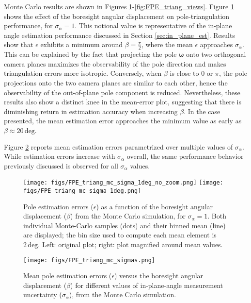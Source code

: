 Monte Carlo results are shown in Figures \ref{fig:FPE_triang_mc_sigma_1deg}-\ref{fig:FPE_triang_views}. Figure \ref{fig:FPE_triang_mc_sigma_1deg} shows the effect of the boresight angular displacement on pole-triangulation performance, for $\sigma_\alpha=1$. This notional value is representative of the in-plane angle estimation performance discussed in Section \ref{sec:in_plane_est}. Results show that $\epsilon$ exhibits a minimum around $\beta=\frac{\pi}{2}$, where the mean $\epsilon$ approaches $\sigma_\alpha$. This can be explained by the fact that projecting the pole $\boldsymbol{\omega}$ onto two orthogonal camera planes maximizes the observability of the pole direction and makes triangulation errors more isotropic. Conversely, when $\beta$ is close to $0$ or $\pi$, the pole projections onto the two camera planes are similar to each other, hence the observability of the out-of-plane pole component is reduced. Nevertheless, these results also show a distinct knee in the mean-error plot, suggesting that there is diminishing return in estimation accuracy when increasing $\beta$. In the case presented, the mean estimation error approaches the minimum value as early as $\beta \approx 20\,\mathrm{deg}$. 

Figure \ref{fig:FPE_triang_mc_sigmas} reports mean estimation errors parametrized over multiple values of $\sigma_\alpha$. While estimation errors increase with $\sigma_\alpha$ overall, the same performance behavior previously discussed is observed for all $\sigma_\alpha$ values.

\begin{figure}
    \centering
    \texttt{[image: figs/FPE\_triang\_mc\_sigma\_1deg\_no\_zoom.png]}
    \texttt{[image: figs/FPE\_triang\_mc\_sigma\_1deg.png]}
    \caption{Pole estimation errors ($\epsilon$) as a function of the boresight angular displacement ($\beta$) from the Monte Carlo simulation, for $\sigma_\alpha=1$. Both individual Monte-Carlo samples (dots) and their binned mean (line) are displayed; the bin size used to compute each mean element is $2\,\mathrm{deg}$. Left: original plot; right: plot magnified around mean values.}
    \label{fig:FPE_triang_mc_sigma_1deg}
\end{figure}

\begin{figure}
    \centering
    \texttt{[image: figs/FPE\_triang\_mc\_sigmas.png]}
    \caption{Mean pole estimation errors ($\epsilon$) versus the boresight angular displacement ($\beta$) for different values of in-plane-angle measurement uncertainty ($\sigma_\alpha$), from the Monte Carlo simulation.}
    \label{fig:FPE_triang_mc_sigmas}
\end{figure}

